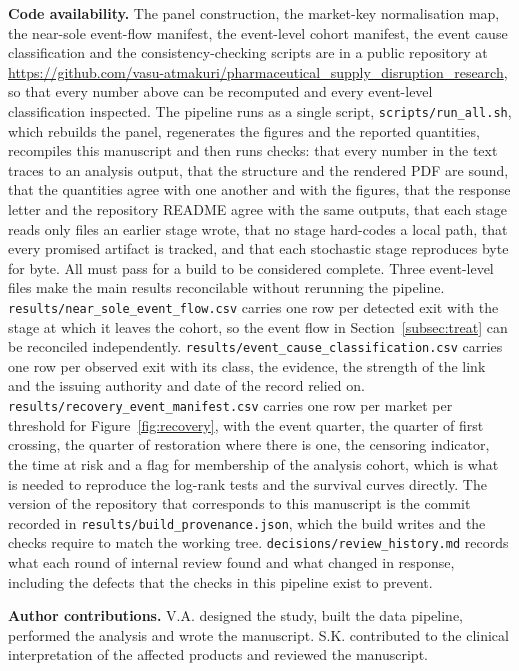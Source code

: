 \documentclass[pdflatex,sn-vancouver-num,Numbered]{sn-jnl}
\begin{document}
\textbf{Code availability.} The panel construction, the market-key normalisation map, the
near-sole event-flow manifest, the event-level cohort manifest, the event cause classification and
the consistency-checking scripts are in a public repository at
\url{https://github.com/vasu-atmakuri/pharmaceutical_supply_disruption_research}, so that every
number above can be recomputed and every event-level classification inspected. The pipeline runs
as a single script, \texttt{scripts/run\_all.sh}, which rebuilds the panel, regenerates the
figures and the reported quantities, recompiles this manuscript and then runs \nChecks checks:
that every number in the text traces to an analysis output, that the structure and the rendered
PDF are sound, that the quantities agree with one another and with the figures, that the
response letter and the repository README agree with the same outputs, that each stage reads
only files an earlier stage wrote, that no stage hard-codes a local path, that every promised
artifact is tracked, and that each stochastic stage reproduces byte for byte. All \nChecks must
pass for a build to be considered complete. Three event-level files make the main results
reconcilable without rerunning the pipeline.
\texttt{results/near\_sole\_event\_flow.csv} carries one row per detected exit with the stage at
which it leaves the cohort, so the event flow in Section~\ref{subsec:treat} can be reconciled
independently. \texttt{results/event\_cause\_classification.csv} carries one row per observed
exit with its class, the evidence, the strength of the link and the issuing authority and date
of the record relied on. \texttt{results/recovery\_event\_manifest.csv} carries one row per
market per threshold for Figure~\ref{fig:recovery}, with the event quarter, the quarter of first
crossing, the quarter of restoration where there is one, the censoring indicator, the time at
risk and a flag for membership of the analysis cohort, which is what is needed to reproduce the
log-rank tests and the survival curves directly. The version of the repository that corresponds
to this manuscript is the commit recorded in \texttt{results/build\_provenance.json}, which the
build writes and the checks require to match the working tree.
\texttt{decisions/review\_history.md} records what each round of internal review found and what
changed in response, including the defects that the checks in this pipeline exist to prevent.

\textbf{Author contributions.} V.A. designed the study, built the data pipeline, performed the
analysis and wrote the manuscript. S.K. contributed to the clinical interpretation of the
affected products and reviewed the manuscript.



\end{document}
